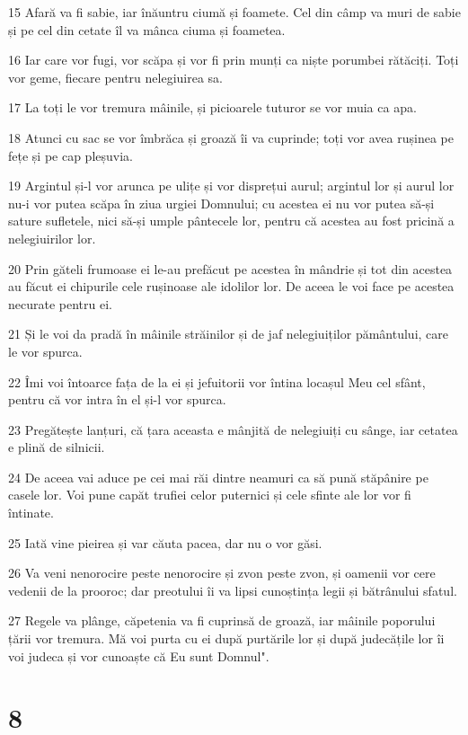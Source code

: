 \par 15 Afară va fi sabie, iar înăuntru ciumă și foamete. Cel din câmp va muri de sabie și pe cel din cetate îl va mânca ciuma și foametea.
\par 16 Iar care vor fugi, vor scăpa și vor fi prin munți ca niște porumbei rătăciți. Toți vor geme, fiecare pentru nelegiuirea sa.
\par 17 La toți le vor tremura mâinile, și picioarele tuturor se vor muia ca apa.
\par 18 Atunci cu sac se vor îmbrăca și groază îi va cuprinde; toți vor avea rușinea pe fețe și pe cap pleșuvia.
\par 19 Argintul și-l vor arunca pe ulițe și vor disprețui aurul; argintul lor și aurul lor nu-i vor putea scăpa în ziua urgiei Domnului; cu acestea ei nu vor putea să-și sature sufletele, nici să-și umple pântecele lor, pentru că acestea au fost pricină a nelegiuirilor lor.
\par 20 Prin găteli frumoase ei le-au prefăcut pe acestea în mândrie și tot din acestea au făcut ei chipurile cele rușinoase ale idolilor lor. De aceea le voi face pe acestea necurate pentru ei.
\par 21 Și le voi da pradă în mâinile străinilor și de jaf nelegiuiților pământului, care le vor spurca.
\par 22 Îmi voi întoarce fața de la ei și jefuitorii vor întina locașul Meu cel sfânt, pentru că vor intra în el și-l vor spurca.
\par 23 Pregătește lanțuri, că țara aceasta e mânjită de nelegiuiți cu sânge, iar cetatea e plină de silnicii.
\par 24 De aceea vai aduce pe cei mai răi dintre neamuri ca să pună stăpânire pe casele lor. Voi pune capăt trufiei celor puternici și cele sfinte ale lor vor fi întinate.
\par 25 Iată vine pieirea și var căuta pacea, dar nu o vor găsi.
\par 26 Va veni nenorocire peste nenorocire și zvon peste zvon, și oamenii vor cere vedenii de la prooroc; dar preotului îi va lipsi cunoștința legii și bătrânului sfatul.
\par 27 Regele va plânge, căpetenia va fi cuprinsă de groază, iar mâinile poporului țării vor tremura. Mă voi purta cu ei după purtările lor și după judecățile lor îi voi judeca și vor cunoaște că Eu sunt Domnul".

\chapter{8}

